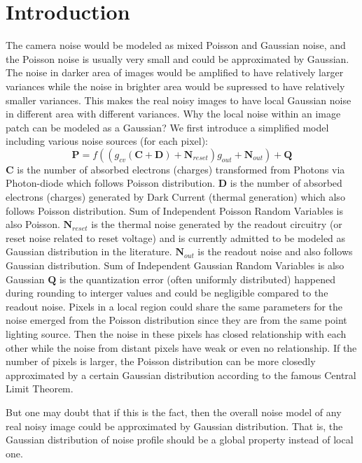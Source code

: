 \documentclass[10pt,twocolumn,letterpaper]{article}
\begin{document}
\section{Introduction}
The camera noise would be modeled as mixed Poisson and Gaussian noise, and the Poisson noise is usually very small and could be approximated by Gaussian. The noise in darker area of images would be amplified to have relatively larger variances while the noise in brighter area would be supressed to have relatively smaller variances. This makes the real noisy images to have local Gaussian noise in different area with different variances. Why the local noise within an image patch can be modeled as a Gaussian? We first introduce a simplified model including various noise sources (for each pixel):
\begin{equation}
\textbf{P} = f((g_{cv}(\textbf{C}+\textbf{D})+\textbf{N}_{reset})g_{out}+\textbf{N}_{out})+\textbf{Q}
\end{equation}
$\mathbf{C}$ is the number of absorbed electrons (charges) transformed from Photons via Photon-diode which follows Poisson distribution. $\mathbf{D}$ is the number of absorbed electrons (charges) generated by Dark Current (thermal generation) which also follows Poisson distribution. Sum of Independent Poisson Random Variables is also Poisson. $\mathbf{N}_{reset}$ is the thermal noise generated by the readout circuitry (or reset noise related to reset voltage) and is currently admitted to be modeled as Gaussian distribution in the literature. $\mathbf{N}_{out}$ is the readout noise and also follows Gaussian distribution. Sum of Independent Gaussian Random Variables is also Gaussian $\mathbf{Q}$ is the quantization error (often uniformly distributed) happened during rounding to interger values and could be negligible compared to the readout noise. Pixels in a local region could share the same parameters for the noise emerged from the Poisson distribution since they are from the same point lighting source. Then the noise in these pixels has closed relationship with each other while the noise from distant pixels have weak or even no relationship. If the number of pixels is larger, the Poisson distribution can be more closedly approximated by a certain Gaussian distribution according to the famous Central Limit Theorem. 

But one may doubt that if this is the fact, then the overall noise model of any real noisy image could be approximated by Gaussian distribution. That is, the Gaussian distribution of noise profile should be a global property instead of local one. 
\end{document}
